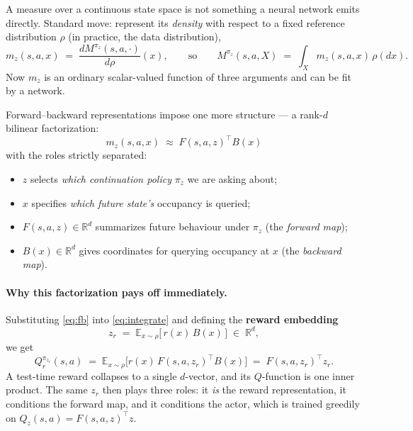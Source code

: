 \documentclass[11pt]{article}
\newcommand{\E}{\mathbb{E}}
\begin{document}
A measure over a continuous state space is not something a neural network emits
directly. Standard move: represent its \emph{density} with respect to a fixed
reference distribution $\rho$ (in practice, the data distribution),
\begin{equation}
\label{eq:density}
m_z(s,a,x) \;=\; \frac{dM^{\pi_z}(s,a,\cdot)}{d\rho}(x),
\qquad\text{so}\qquad
M^{\pi_z}(s,a,X) \;=\; \int_X m_z(s,a,x)\,\rho(dx).
\end{equation}
Now $m_z$ is an ordinary scalar-valued function of three arguments and can be
fit by a network.

Forward--backward representations impose one more structure --- a rank-$d$
bilinear factorization:
\begin{equation}
\label{eq:fb}
\boxed{\;m_z(s,a,x)\;\approx\;F(s,a,z)^{\top} B(x)\;}
\end{equation}
with the roles strictly separated:
\begin{itemize}[nosep,leftmargin=1.4em]
  \item $z$ \; selects \emph{which continuation policy} $\pi_z$ we are asking about;
  \item $x$ \; specifies \emph{which future state's} occupancy is queried;
  \item $F(s,a,z)\in\mathbb{R}^d$ summarizes future behaviour under $\pi_z$ (the \emph{forward map});
  \item $B(x)\in\mathbb{R}^d$ gives coordinates for querying occupancy at $x$ (the \emph{backward map}).
\end{itemize}

\paragraph{Why this factorization pays off immediately.} Substituting
\eqref{eq:fb} into \eqref{eq:integrate} and defining the \textbf{reward embedding}
\begin{equation}
\label{eq:zr}
z_r \;=\; \E_{x\sim\rho}\big[\, r(x)\, B(x)\,\big] \;\in\;\mathbb{R}^d,
\end{equation}
we get
\begin{equation}
Q_r^{\pi_{z_r}}(s,a)
\;=\;\E_{x\sim\rho}\!\big[r(x)\,F(s,a,z_r)^{\top}B(x)\big]
\;=\; F(s,a,z_r)^{\top} z_r .
\end{equation}
A test-time reward collapses to a single $d$-vector, and its $Q$-function is one
inner product. The same $z_r$ then plays three roles: it \emph{is} the reward
representation, it conditions the forward map, and it conditions the actor, which
is trained greedily on $Q_z(s,a)=F(s,a,z)^\top z$.
\end{document}

